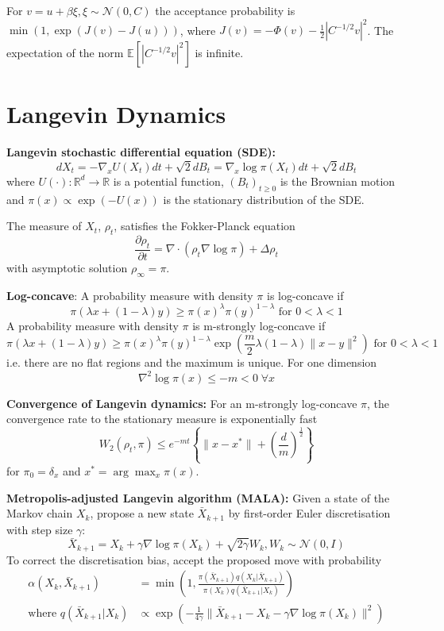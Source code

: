 \documentclass[12pt]{article}
\begin{document}
For $v = u + \beta \xi, \xi \sim \mathcal{N}(0, C)$ the acceptance probability is $\min(1, \exp(J(v) - J(u)))$, where $J(v) = - \Phi(v) - \frac{1}{2}|C^{-1/2} v|^2$. The expectation of the norm $\mathbb{E}[|C^{-1/2} v|^2]$ is infinite.  

\section{Langevin Dynamics}
\textbf{Langevin stochastic differential equation (SDE):} $$dX_t = -\nabla_x U(X_t) dt + \sqrt{2} dB_t = \nabla_x \log \pi(X_t) dt + \sqrt{2} dB_t$$
where $U(\cdot): \mathbb{R}^d \to \mathbb{R}$ is a potential function, $(B_t)_{t \geq 0}$ is the Brownian motion and $\pi(x) \propto \exp(-U(x))$ is the stationary distribution of the SDE.

The measure of $X_t$, $\rho_t$, satisfies the Fokker-Planck equation
$$
\frac{\partial \rho_t}{\partial t} = \nabla \cdot (\rho_t \nabla \log \pi) + \Delta \rho_t
$$
with asymptotic solution $\rho_\infty = \pi$.

\textbf{Log-concave}: A probability measure with density $\pi$ is log-concave if
$$
\pi(\lambda x + (1-\lambda) y) \geq \pi(x)^\lambda \pi(y)^{1-\lambda} \text{ for } 0 < \lambda < 1
$$
A probability measure with density $\pi$ is m-strongly log-concave if
$$
\pi(\lambda x + (1-\lambda) y) \geq \pi(x)^\lambda \pi(y)^{1-\lambda} \exp\left( \frac{m}{2} \lambda (1-\lambda) \|x-y\|^2 \right) \text{ for } 0 < \lambda < 1
$$
i.e. there are no flat regions and the maximum is unique.
For one dimension
$$
\nabla^2 \log \pi(x) \leq -m < 0 \; \forall x
$$

\textbf{Convergence of Langevin dynamics:} For an m-strongly log-concave $\pi$, the convergence rate to the stationary measure is exponentially fast
$$
W_2(\rho_t, \pi) \leq e^{-mt} \left\{\|x - x^*\| + \left(\frac{d}{m}\right)^\frac{1}{2}\right\}
$$
for $\pi_0 = \delta_x$ and $x^* = \arg\max_x \pi(x)$.

\textbf{Metropolis-adjusted Langevin algorithm (MALA):} Given a state of the Markov chain $X_k$, propose a new state $\bar{X}_{k+1}$ by first-order Euler discretisation with step size $\gamma$:
$$
\bar{X}_{k+1} = X_k + \gamma \nabla \log \pi(X_k) + \sqrt{2\gamma} W_k, W_k \sim \mathcal{N}(0, I)
$$
To correct the discretisation bias, accept the proposed move with probability
\begin{align*}
\alpha(X_k, \bar{X}_{k+1}) &= \min\left(1, \frac{\pi(\bar{X}_{k+1}) q(X_k | \bar{X}_{k+1})}{\pi(X_k) q(\bar{X}_{k+1}| X_k)}\right) \\
\text{where } q(\bar{X}_{k+1}| X_k) &\propto \exp\left(-\frac{1}{4\gamma} \|\bar{X}_{k+1} - X_k - \gamma \nabla \log \pi(X_k)\|^2\right)
\end{align*}
\end{document}
